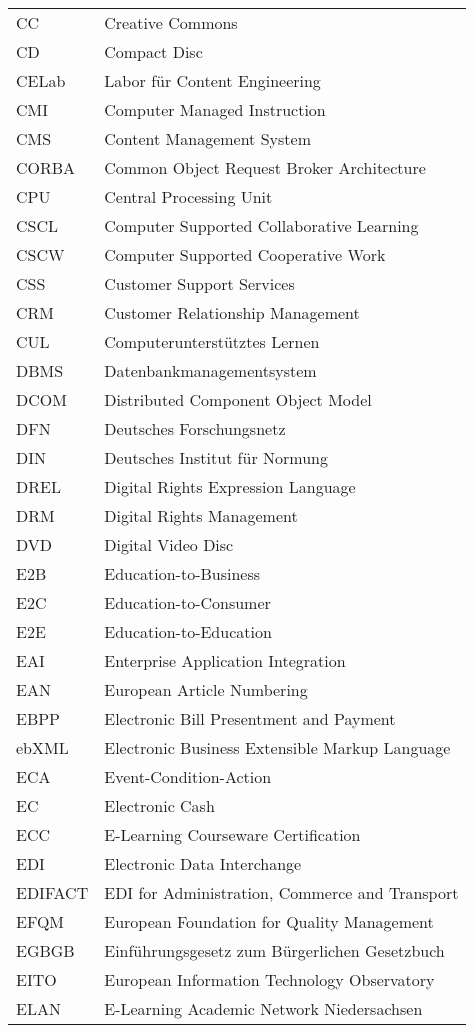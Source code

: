\begin{longtable}[ht]{ll}
CC & Creative Commons\\  %
CD & Compact Disc\\  %
CELab & Labor für Content Engineering\\  %
CMI & Computer Managed Instruction\\  %
CMS & Content Management System\\  %
CORBA & Common Object Request Broker Architecture\\  %
CPU & Central Processing Unit\\  %
CSCL & Computer Supported Collaborative Learning\\  %
CSCW & Computer Supported Cooperative Work\\  %
CSS & Customer Support Services\\  %
CRM & Customer Relationship Management\\  %
CUL & Computerunterstütztes Lernen\\  %
DBMS & Datenbankmanagementsystem\\  %
DCOM & Distributed Component Object Model\\  %
DFN & Deutsches Forschungsnetz\\  %
DIN & Deutsches Institut für Normung\\  %
DREL & Digital Rights Expression Language\\  %
DRM & Digital Rights Management\\  %
DVD & Digital Video Disc\\  %
E2B & Education-to-Business\\  %
E2C & Education-to-Consumer\\  %
E2E & Education-to-Education\\  %
EAI & Enterprise Application Integration\\  %
EAN & European Article Numbering\\  %
EBPP & Electronic Bill Presentment and Payment\\  %
ebXML & Electronic Business Extensible Markup Language\\ %
ECA & Event-Condition-Action\\  %
EC & Electronic Cash\\  %
ECC & E-Learning Courseware Certification\\  %
EDI & Electronic Data Interchange\\  %
EDIFACT & EDI for Administration, Commerce and Transport\\  %
EFQM & European Foundation for Quality Management\\  %
EGBGB & Einführungsgesetz zum Bürgerlichen Gesetzbuch\\  %
EITO & European Information Technology Observatory\\  %
ELAN & E-Learning Academic Network Niedersachsen\\  %
\end{longtable}
